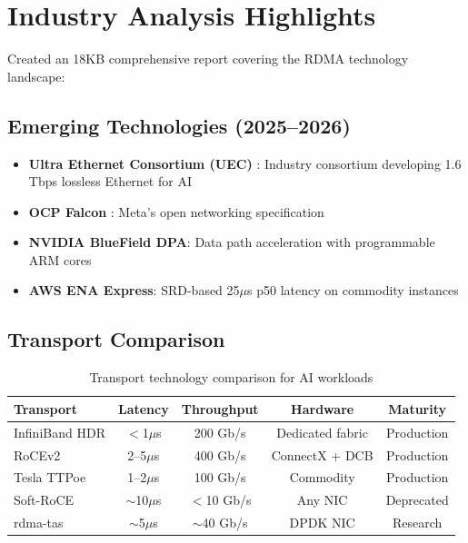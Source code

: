 \documentclass[10pt,letterpaper]{article}
\begin{document}
\section{Industry Analysis Highlights}

Created an 18KB comprehensive report covering the RDMA technology landscape:

\subsection{Emerging Technologies (2025--2026)}

\begin{itemize}[noitemsep]
    \item \textbf{Ultra Ethernet Consortium (UEC)} \cite{uec-spec}: Industry consortium developing 1.6 Tbps lossless Ethernet for AI
    \item \textbf{OCP Falcon} \cite{ocp-falcon}: Meta's open networking specification
    \item \textbf{NVIDIA BlueField DPA}: Data path acceleration with programmable ARM cores
    \item \textbf{AWS ENA Express}: SRD-based 25$\mu$s p50 latency on commodity instances
\end{itemize}

\subsection{Transport Comparison}

\begin{table}[H]
\centering
\small
\begin{tabular}{@{}lcccc@{}}
\toprule
\textbf{Transport} & \textbf{Latency} & \textbf{Throughput} & \textbf{Hardware} & \textbf{Maturity} \\
\midrule
InfiniBand HDR & $<$1$\mu$s & 200 Gb/s & Dedicated fabric & Production \\
RoCEv2 & 2--5$\mu$s & 400 Gb/s & ConnectX + DCB & Production \\
Tesla TTPoe & 1--2$\mu$s & 100 Gb/s & Commodity & Production \\
Soft-RoCE & $\sim$10$\mu$s & $<$10 Gb/s & Any NIC & Deprecated \\
rdma-tas & $\sim$5$\mu$s & $\sim$40 Gb/s & DPDK NIC & Research \\
\bottomrule
\end{tabular}
\caption{Transport technology comparison for AI workloads}
\end{table}
\end{document}
